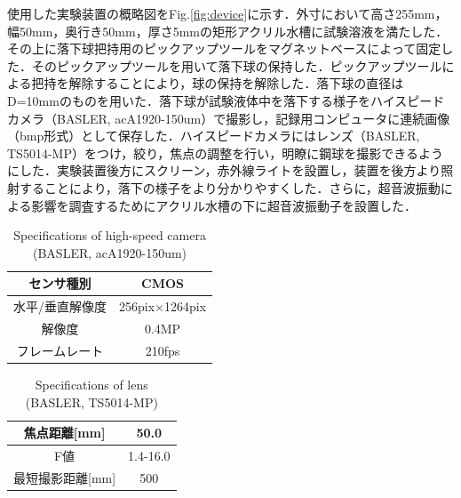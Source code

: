 使用した実験装置の概略図をFig.\ref{fig:device}に示す．外寸において高さ255mm，幅50mm，奥行き50mm，厚さ5mmの矩形アクリル水槽に試験溶液を満たした．その上に落下球把持用のピックアップツールをマグネットベースによって固定した．そのピックアップツールを用いて落下球の保持した．ピックアップツールによる把持を解除することにより，球の保持を解除した．落下球の直径はD=10mmのものを用いた．落下球が試験液体中を落下する様子をハイスピードカメラ（BASLER, acA1920-150um）で撮影し，記録用コンピュータに連続画像（bmp形式）として保存した．ハイスピードカメラにはレンズ（BASLER, TS5014-MP）をつけ，絞り，焦点の調整を行い，明瞭に鋼球を撮影できるようにした．実験装置後方にスクリーン，赤外線ライトを設置し，装置を後方より照射することにより，落下の様子をより分かりやすくした．さらに，超音波振動による影響を調査するためにアクリル水槽の下に超音波振動子を設置した．

\begin{table}[ht]
    \centering
    \caption{Specifications of high-speed camera (BASLER, acA1920-150um)}
    \label{table:camera}
    \begin{tabular}{c|c}\hline
        センサ種別      & CMOS                  \\ \hline
        水平/垂直解像度 & 256pix$\times$1264pix \\ \hline
        解像度          & 0.4MP                 \\ \hline
        フレームレート  & 210fps                \\ \hline
    \end{tabular}
\end{table}

\begin{table}[ht]
    \centering
    \caption{Specifications of lens (BASLER, TS5014-MP)}
    \label{table:lens}
    \begin{tabular}{c|c}\hline
        焦点距離[mm]     & 50.0     \\ \hline
        F値              & 1.4-16.0 \\ \hline
        最短撮影距離[mm] & 500      \\ \hline
    \end{tabular}
\end{table}

